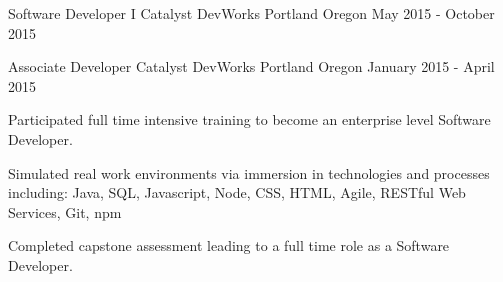 \begin{cventries}
  \cventry
    {Software Developer I}
    {Catalyst DevWorks}
    {Portland Oregon}
    {May 2015 - October 2015}
    {}

  \cventry
    {Associate Developer}
    {Catalyst DevWorks}
    {Portland Oregon}
    {January 2015 - April 2015}
    {
      \begin{cvitems}
        \item {Participated full time intensive training to become an enterprise level Software Developer.}
        \item {Simulated real work environments via immersion in technologies and processes including: Java, SQL, Javascript, Node, CSS, HTML, Agile, RESTful Web Services, Git, npm}
        \item {Completed capstone assessment leading to a full time role as a Software Developer.}
      \end{cvitems}
    }

\end{cventries}
